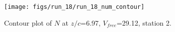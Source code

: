 \begin{figure}[H]
\centering
\texttt{[image: figs/run\_18/run\_18\_num\_contour]}
\caption{Contour plot of $N$ at $z/c$=6.97, $V_{free}$=29.12, station 2.}
\label{fig:run_18_num_contour}
\end{figure}


